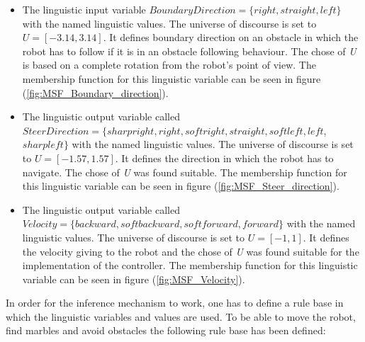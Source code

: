 \documentclass[../Head/Main.tex]{subfiles}
\begin{document}
\begin{itemize}
	\item The linguistic input variable $BoundaryDirection = \{right, straight, left\}$ with the named linguistic values. The universe of discourse is set to ${U} = [-3.14, 3.14]$. It defines boundary direction on an obstacle in which the robot has to follow if it is in an obstacle following behaviour. The chose of \textit{U} is based on a complete rotation from the robot's point of view. The membership function for this linguistic variable can be seen in figure (\ref{fig:MSF_Boundary_direction}).
\item The linguistic output variable called $SteerDirection = \{sharpright, right, softright, straight, softleft, left$, $sharpleft\}$ with the named linguistic values. The universe of discourse is set to ${U} = [-1.57, 1.57]$. It defines the direction in which the robot has to navigate. The chose of \textit{U} was found suitable. The membership function for this linguistic variable can be seen in figure (\ref{fig:MSF_Steer_direction}).
\item The linguistic output variable called $Velocity = \{backward, softbackward, softforward, forward\}$ with the named linguistic values. The universe of discourse is set to ${U} = [-1, 1]$. It defines the velocity giving to the robot and the chose of \textit{U} was found suitable for the implementation of the controller. The membership function for this linguistic variable can be seen in figure (\ref{fig:MSF_Velocity}).   
\end{itemize}
In order for the inference mechanism to work, one has to define a rule base in which the linguistic variables and values are used. To be able to move the robot, find marbles and avoid obstacles the following rule base has been defined:  
\end{document}
